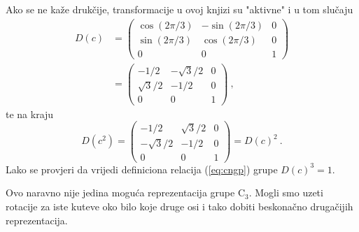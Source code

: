 \begin{primjer}
Ako se ne kaže drukčije, transformacije u ovoj knjizi su "aktivne"
i u tom slučaju
\begin{equation}
\begin{split}
    D(c)& =\left(
\begin{array}{ccc}
\cos(2\pi/3) & -\sin(2\pi/3) & 0 \\
\sin(2\pi/3) & \cos(2\pi/3) & 0 \\
0 & 0 & 1
\end{array}\right) \\
  & =\left(
\begin{array}{ccc}
-1/2 & -\sqrt{3}/2 & 0 \\
\sqrt{3}/2 & -1/2 & 0 \\
0 & 0 & 1
\end{array}\right) \:,
\end{split}
\label{eq:c3rep2}
\end{equation}
te na kraju
\begin{equation}
D(c^2)=
\left(
\begin{array}{ccc}
-1/2 & \sqrt{3}/2 & 0 \\
-\sqrt{3}/2 & -1/2 & 0 \\
0 & 0 & 1
\end{array}\right) = D(c)^2  \:.
\label{eq:c3rep3}
\end{equation}
Lako se provjeri da vrijedi definiciona relacija (\ref{eq:cngp}) grupe
$D(c)^3 = 1$.
\end{primjer}

Ovo naravno nije jedina moguća reprezentacija grupe $\mathrm{C}_3$.
Mogli smo uzeti rotacije za iste kuteve oko bilo koje druge osi i
tako dobiti beskonačno drugačijih reprezentacija.

